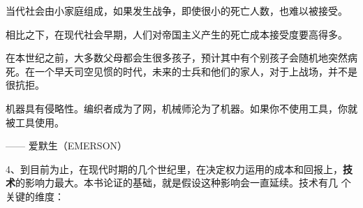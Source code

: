当代社会由小家庭组成，如果发生战争，即使很小的死亡人数，也难以被接受。

相比之下，在现代社会早期，人们对帝国主义产生的死亡成本接受度要高得多。

在本世纪之前，大多数父母都会生很多孩子，预计其中有个别孩子会随机地突然病死。在一个早夭司空见惯的时代，未来的士兵和他们的家人，对于上战场，并不是很抗拒。

\begin{tcolorbox}
机器具有侵略性。编织者成为了网，机械师沦为了机器。如果你不使用工具，你就被工具使用。
\begin{flushright}
—— 爱默生（EMERSON）
\end{flushright}
\end{tcolorbox}

4、到目前为止，在现代时期的几个世纪里，在决定权力运用的成本和回报上，\textbf{技术}的影响力最大。本书论证的基础，就是假设这种影响会一直延续。技术有几 个关键的维度：

